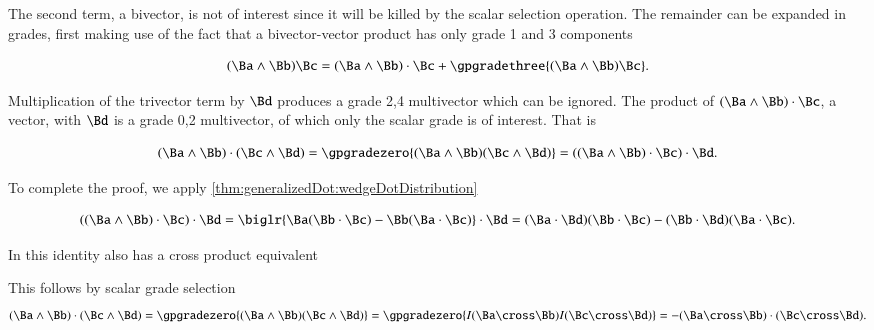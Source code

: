 The second term, a bivector, is not of interest since it will be killed by the scalar selection operation.
The remainder can be expanded in grades, first making use of the fact that a bivector-vector product has only
grade 1 and 3 components

\begin{dmath}\label{eqn:generalizedDot:1180}
(\Ba \wedge \Bb) \Bc
=
(\Ba \wedge \Bb) \cdot \Bc
+ \gpgradethree{ (\Ba \wedge \Bb) \Bc }.
\end{dmath}

Multiplication of the trivector term by \( \Bd \) produces a grade 2,4 multivector which can be ignored.  The product
of \( (\Ba \wedge \Bb) \cdot \Bc \), a vector, with \( \Bd \) is a grade 0,2 multivector, of which only the scalar grade is of interest.
That is

\begin{dmath}\label{eqn:generalizedDot:1220}
(\Ba \wedge \Bb) \cdot (\Bc \wedge \Bd)
= \gpgradezero{ (\Ba \wedge \Bb) (\Bc \wedge \Bd) }
=
((\Ba \wedge \Bb) \cdot \Bc )\cdot \Bd.
\end{dmath}

To complete the proof, we apply \cref{thm:generalizedDot:wedgeDotDistribution}

\begin{dmath}\label{eqn:generalizedDot:1240}
((\Ba \wedge \Bb) \cdot \Bc )\cdot \Bd
=
\biglr{ \Ba (\Bb \cdot \Bc) - \Bb (\Ba \cdot \Bc) } \cdot \Bd
=
(\Ba \cdot \Bd) (\Bb \cdot \Bc) - (\Bb \cdot \Bd) (\Ba \cdot \Bc).
\end{dmath}

In  this identity also has a cross product equivalent


This follows by scalar grade selection
\begin{dmath}\label{eqn:generalizedDot:1140}
(\Ba \wedge \Bb) \cdot (\Bc \wedge \Bd)
=
\gpgradezero{
(\Ba \wedge \Bb) (\Bc \wedge \Bd)
}
=
\gpgradezero{
I (\Ba \cross \Bb) I (\Bc \cross \Bd)
}
=
-(\Ba \cross \Bb) \cdot (\Bc \cross \Bd).
\end{dmath}
